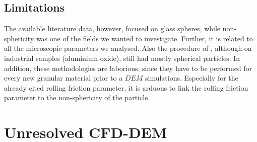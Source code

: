 \subsection{Limitations}
\label{subsec:limitations}

The available literature data, however, focused on glass spheres, while
non-sphericity was one of the fields we wanted to investigate. 
Further, it is related to all the microscopic parameters we analysed. 
Also the procedure of \citet{RefWorks:177}, although on
industrial samples (aluminium oxide), still had mostly spherical particles. 
In addition, these methodologies are laborious, 
since they have to be performed for every new granular material prior to a $DEM$
simulations. 
Especially for the already cited rolling friction parameter, it is arduous to
link the rolling friction parameter to the non-sphericity of the particle. 


\section{Unresolved CFD-DEM}
\label{sec:unresolvedcfddem}

